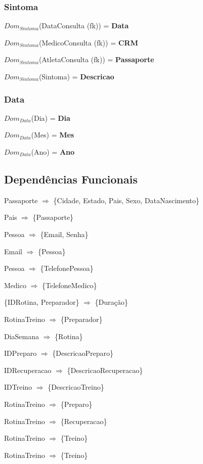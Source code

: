 \documentclass[12pt,a4paper]{article}
\newcommand{\createdomain}[3]{
    $Dom_{#1}$(#2) = {\bf #3}

}
\begin{document}
    \subsubsection{Sintoma}
        \createdomain{Sintoma}{DataConsulta (fk)}{\bf Data}
        \createdomain{Sintoma}{MedicoConsulta (fk)}{\bf CRM}
        \createdomain{Sintoma}{AtletaConsulta (fk)}{\bf Passaporte}
        \createdomain{Sintoma}{Sintoma}{\bf Descricao}

    \subsubsection{Data}
        \createdomain{Data}{Dia}{\bf Dia}
        \createdomain{Data}{Mes}{\bf Mes}
        \createdomain{Data}{Ano}{\bf Ano}

\newpage

\subsection{Dependências Funcionais}

\singlespacing
Passaporte $\Longrightarrow$ \{Cidade, Estado, Pais, Sexo, DataNascimento\}\par
Pais $\Longrightarrow$ \{Passaporte\} \par
Pessoa $\Longrightarrow$ \{Email, Senha\} \par
Email $\Longrightarrow$ \{Pessoa\} \par
Pessoa $\Longrightarrow$ \{TelefonePessoa\} \par
Medico $\Longrightarrow$ \{TelefoneMedico\} \par
\{IDRotina, Preparador\} $\Longrightarrow$ \{Duração\} \par
RotinaTreino $\Longrightarrow$ \{Preparador\} \par
DiaSemana $\Longrightarrow$ \{Rotina\} \par
IDPreparo $\Longrightarrow$ \{DescricaoPreparo\} \par
IDRecuperacao $\Longrightarrow$ \{DescricaoRecuperacao\} \par
IDTreino $\Longrightarrow$ \{DescricaoTreino\} \par
RotinaTreino $\Longrightarrow$ \{Preparo\} \par
RotinaTreino $\Longrightarrow$ \{Recuperacao\} \par
RotinaTreino $\Longrightarrow$ \{Treino\} \par
RotinaTreino $\Longrightarrow$ \{Treino\} \par
\end{document}
